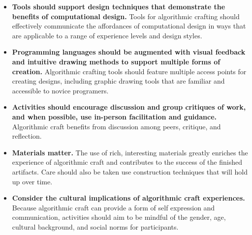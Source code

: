\documentclass{sigchi}
\begin{document}
\begin{itemize}
\item \textbf{Tools should support design techniques that demonstrate the benefits of computational design.} Tools for algorithmic crafting should effectively communicate the affordances of computational design in ways that are applicable to a range of experience levels and design styles.

\item \textbf{Programming languages should be augmented with visual feedback and intuitive drawing methods to support multiple forms of creation.} Algorithmic crafting tools should feature multiple access points for creating designs, including graphic drawing tools that are familiar and accessible to novice programers.

\item \textbf{Activities should encourage discussion and group critiques of work, and when possible, use in-person facilitation and guidance.} Algorithmic craft benefits from discussion among peers, critique, and reflection.

\item \textbf{Materials matter.} The use of rich, interesting materials greatly enriches the experience of algorithmic craft and contributes to the success of the finished artifacts. Care should also be taken use construction techniques that will hold up over time.

\item \textbf{Consider the cultural implications of algorithmic craft experiences.} Because algorithmic craft can provide a form of self expression and communication, activities should aim to be mindful of the gender, age, cultural background, and social norms for participants.
\end{itemize}


\balance




\end{document}
